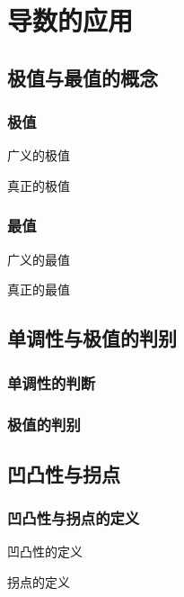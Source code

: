 \documentclass[12pt, a4paper, oneside, UTF8]{ctexbook}  %
\begin{document}
%  
\else
\fi
\chapter{导数的应用}

\section{极值与最值的概念}

\subsection{极值}
\begin{defn}{广义的极值}{}

\end{defn}

\begin{defn}{真正的极值}{}

\end{defn}

\subsection{最值}
\begin{defn}{广义的最值}{}

\end{defn}

\begin{defn}{真正的最值}{}

\end{defn}

\section{单调性与极值的判别}

\subsection{单调性的判断}

\subsection{极值的判别}

\section{凹凸性与拐点}

\subsection{凹凸性与拐点的定义}
\begin{defn}{凹凸性的定义}{}

\end{defn}
\begin{defn}{拐点的定义}{}

\end{defn}
\end{document}
